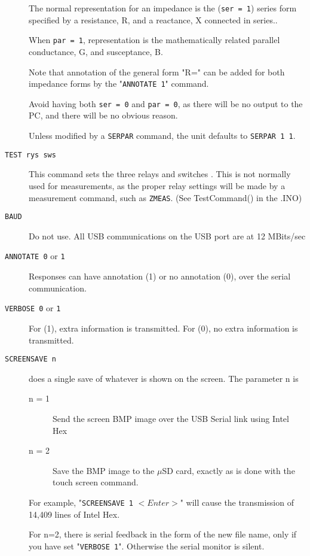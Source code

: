 \begin{description}
The normal representation for an impedance is the (\texttt{ser = 1}) series form specified by a resistance, R, and a reactance, X connected in series..

When \texttt{par = 1}, representation is the mathematically related parallel conductance, G, and susceptance, B.

Note that annotation of the general form "R=" can be added for both impedance forms by the "\texttt{ANNOTATE 1}" command.

Avoid having both \texttt{ser = 0} and \texttt{par = 0}, as there will be no output to the PC, and there will be no obvious reason.

Unless modified by a \texttt{SERPAR} command, the unit defaults to \newline \texttt{SERPAR 1 1}.

\item[\texttt{TEST rys sws}] This command sets the three relays and switches .  This is not normally used for measurements, as the proper relay settings will be made by a measurement command, such as \texttt{ZMEAS}.  (See TestCommand()  in the .INO)

\item[\texttt{BAUD}]   Do not use.  All USB communications on the USB port are at 12 MBits/sec

\item[\texttt{ANNOTATE 0} or \texttt{1}]  Responses can have annotation (1) or no annotation (0), over the serial communication.

\item[\texttt{VERBOSE 0} or \texttt{1}]  For (1), extra information is transmitted. For (0), no extra information is transmitted.

\item[\texttt{SCREENSAVE n}] does a single save of whatever is shown on the screen.  The parameter n is
\begin{description}
\item[n = 1] Send the screen BMP image over the USB Serial link using Intel Hex
\item[n = 2] Save the BMP image to the $\mu$SD card, exactly as is done with the touch screen command.
\end{description}

For example, "\texttt{SCREENSAVE 1} $<Enter>$" will cause the transmission of 14,409 lines of Intel Hex.

For n=2, there is serial feedback in the form of the new file name, only if you have set "\texttt{VERBOSE 1}".  Otherwise the serial monitor is silent.


\end{description}
